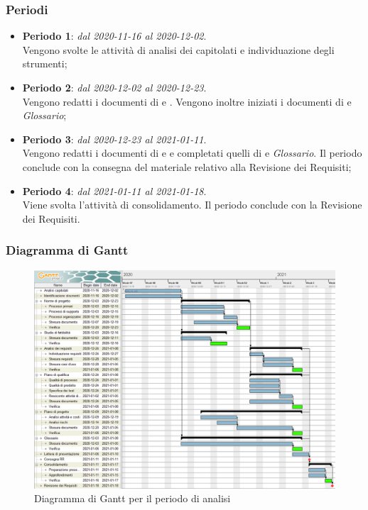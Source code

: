 \subsubsection{Periodi}

\begin{itemize}
\item \textbf{Periodo 1}: \textit{dal 2020-11-16 al 2020-12-02}. \\
Vengono svolte le attività di analisi dei capitolati e individuazione degli strumenti;
\item \textbf{Periodo 2}: \textit{dal 2020-12-02 al 2020-12-23}. \\
Vengono redatti i documenti di \NdP{} e \SdF{}. Vengono inoltre iniziati i documenti di \PdP{} e \textit{Glossario};
\item \textbf{Periodo 3}: \textit{dal 2020-12-23 al 2021-01-11}. \\
Vengono redatti i documenti di \PdQ{} e \AdR{} e completati quelli di \PdP{} e \textit{Glossario}. Il periodo conclude con la consegna del materiale relativo alla Revisione dei Requisiti;
\item \textbf{Periodo 4}: \textit{dal 2021-01-11 al 2021-01-18}. \\
Viene svolta l'attività di consolidamento. Il periodo conclude con la Revisione dei Requisiti.
\end{itemize}

\subsubsection{Diagramma di Gantt}

\begin{figure}[H]
\centering

\centerline{\includegraphics[scale=0.6]{res/Pianificazione/Gantt/analisi}}
\caption{Diagramma di Gantt per il periodo di analisi}
\end{figure}
